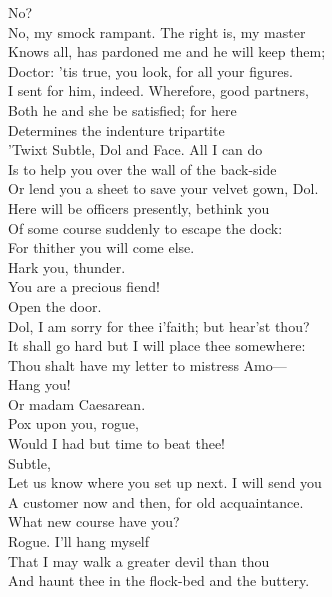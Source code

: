 \documentclass[a4paper,oneside,12pt]{memoir}
\begin{document}
\begin{drama*}
\dolspeaks No?\\
\facespeaks {} No, my smock rampant. The right is, my master\\
Knows all, has pardoned me and he will keep them;\\
Doctor: 'tis true, you look, for all your figures.\\
I sent for him, indeed. Wherefore, good partners,\\
Both he and she be satisfied; for here\\
Determines the indenture tripartite\\
'Twixt Subtle, Dol and Face. All I can do\\
Is to help you over the wall of the back-side\\
Or lend you a sheet to save your velvet gown, Dol.\\
Here will be officers presently, bethink you\\
Of some course suddenly to escape the dock:\\
For thither you will come else.\\
 Hark you, thunder.\\
\subtlespeaks You are a precious fiend!\\
\mammonspeaks {} Open the door.\\
\facespeaks Dol, I am sorry for thee i'faith; but hear'st thou?\\
It shall go hard but I will place thee somewhere:\\
Thou shalt have my letter to mistress Amo---\\
\dolspeaks Hang you!\\
\facespeaks {} Or madam Caesarean.\\
\dolspeaks {} Pox upon you, rogue,\\
Would I had but time to beat thee!\\
\facespeaks {} Subtle,\\
Let us know where you set up next. I will send you\\
A customer now and then, for old acquaintance.\\
What new course have you?\\
\subtlespeaks {} Rogue. I'll hang myself\\
That I may walk a greater devil than thou\\
And haunt thee in the flock-bed and the buttery.\\


\end{drama*}
\end{document}
